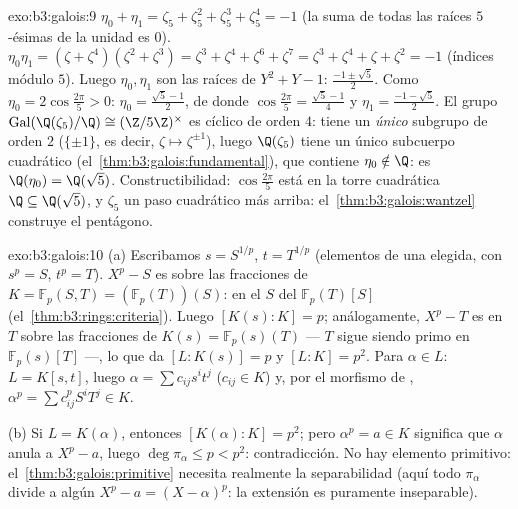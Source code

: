 \begin{solution}{exo:b3:galois:9}
$\eta_0 + \eta_1 = \zeta_5 + \zeta_5^2 + \zeta_5^3 + \zeta_5^4 =
-1$ (la suma de todas las raíces $5$-ésimas de la unidad es $0$).
$\eta_0\eta_1 =
(\zeta + \zeta^4)(\zeta^2 + \zeta^3) = \zeta^3 + \zeta^4 +
\zeta^6 + \zeta^7 = \zeta^3 + \zeta^4 + \zeta + \zeta^2 = -1$ (índices
módulo $5$). Luego $\eta_0, \eta_1$ son las raíces de $Y^2 + Y
- 1$: $\frac{-1 \pm \sqrt5}2$. Como $\eta_0 =
2\cos\frac{2\pi}5 > 0$: $\eta_0 = \frac{\sqrt5 - 1}2$, de donde
$\cos\frac{2\pi}5 = \frac{\sqrt5 - 1}4$ y $\eta_1 =
\frac{-1-\sqrt5}2$. El grupo
$\operatorname{Gal}(\Q(\zeta_5)/\Q) \cong (\Z/5\Z)^\times$ es cíclico de
orden $4$: tiene un \emph{único} subgrupo de orden $2$ ($\{\pm 1\}$, es
decir, $\zeta \mapsto \zeta^{\pm1}$), luego $\Q(\zeta_5)$ tiene un único
subcuerpo cuadrático (el~\cref{thm:b3:galois:fundamental}), que contiene
$\eta_0
\notin \Q$: es $\Q(\eta_0) = \Q(\sqrt5)$.
Constructibilidad:
$\cos\frac{2\pi}5$ está en la torre cuadrática $\Q \subseteq
\Q(\sqrt5)$, y $\zeta_5$ un paso cuadrático más arriba:
el~\cref{thm:b3:galois:wantzel} construye el pentágono.
\end{solution}

\begin{solution}{exo:b3:galois:10}
(a) Escribamos $s = S^{1/p}$, $t = T^{1/p}$ (elementos de una
 elegida, con
$s^p = S$, $t^p = T$). $X^p - S$ es
 sobre las fracciones de
$K = \mathbb F_p(S, T) = (\mathbb
F_p(T))(S)$:  en el
 $S$ del
 $\mathbb F_p(T)[S]$
(el~\cref{thm:b3:rings:criteria}). Luego $[K(s):K] = p$; análogamente,
$X^p - T$ es  en $T$ sobre las
fracciones de $K(s) = \mathbb F_p(s)(T)$ --- $T$ sigue siendo primo en
$\mathbb F_p(s)[T]$ ---, lo que da $[L : K(s)] = p$ y $[L:K] =
p^2$. Para $\alpha \in L$: $L = K[s, t]$, luego $\alpha = \sum
c_{ij}s^it^j$ ($c_{ij} \in K$) y, por el morfismo de
,
$\alpha^p = \sum c_{ij}^p S^iT^j \in K$.

(b) Si $L = K(\alpha)$, entonces $[K(\alpha):K] = p^2$; pero
$\alpha^p = a \in K$ significa que $\alpha$ anula a $X^p - a$, luego
$\deg\pi_\alpha \leq p < p^2$: contradicción. No hay elemento primitivo:
el~\cref{thm:b3:galois:primitive} necesita realmente la separabilidad
(aquí todo $\pi_\alpha$ divide a algún $X^p - a =
(X - \alpha)^p$: la extensión es puramente inseparable).
\end{solution}


